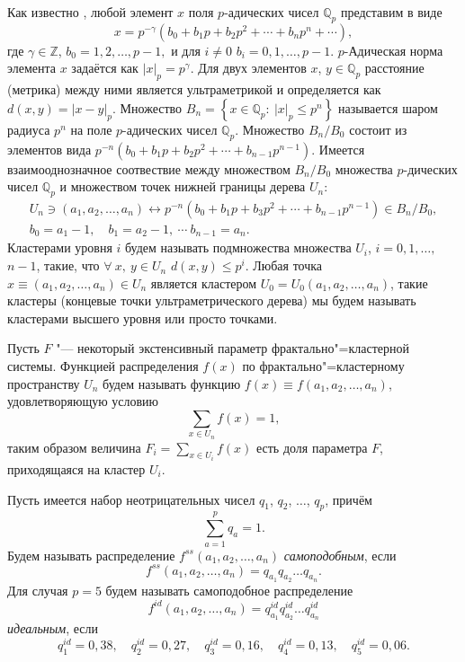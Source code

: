 Как известно \cite{zubarev_volov:bib:S,zubarev_volov:bib:VVZ}, любой элемент $x$ поля $p$-адических чисел $\mathbb Q_p$ представим в виде
$$x=p^{-\gamma}\left(b_{0}+b_{1}p+b_{2}p^{2}+\cdots+b_{n}p^{n}+\cdots\right),$$
где $\gamma\in\mathbb{Z}$, $b_{0}=1, 2, \ldots,p-1,$ и для $i\neq0$
$b_{i}=0, 1, \ldots,p-1$. $p$-Адическая норма элемента $x$ задаётся
как $|x|_{p}=p^{\gamma}.$ 
Для двух элементов $x$, $y\in \mathbb Q_{p}$
расстояние (метрика) между ними является ультраметрикой и
определяется как $d(x,y)=|x-y|_{p}.$ Множество $B_{n}=\left\{
x\in\mathit{\mathbb Q_{p}}:\:|x|_{p}\leq p^{n}\right\} $ называется шаром
радиуса $p^{n}$ на поле $p$-адических чисел
$\mathcal{\mathit{\mathbb Q_{p}}}$. Множество $B_{n}/B_{0}$ состоит из
элементов вида
$p^{-n}\left(b_{0}+b_{1}p+b_{2}p^{2}+\cdots+b_{n-1}p^{n-1}\right)$.
Имеется взаимооднозначное соотвествие между множеством
$B_{n}/B_{0}$ множества $p$-дических чисел $\mathbb Q_{p}$ и множеством
точек нижней границы дерева $U_{n}$:
\begin{gather*}
U_{n}\ni (a_1,a_2,\ldots,a_n) \longleftrightarrow
p^{-n}\left(b_{0}+b_{1}p+b_{3}p^{2}+\cdots+b_{n-1}p^{n-1}\right)\in
B_{n}/B_{0},\\
b_{0}=a_{1}-1, \quad b_{1}=a_{2}-1,\:\cdots\: b_{n-1}=a_{n}.
\end{gather*}
Кластерами уровня $i$ будем называть
подмножества множества $U_i$, $i=0, 1, \ldots,$ $n-1$, такие, что
$\forall\: x,\: y\in U_{n}$ $d(x,y)\leq p^{i}$. Любая точка
$x\equiv\left(a_{1},a_{2},\ldots,a_{n}\right)\in U_{n}$ является
кластером $U_{0}=U_{0}\left(a_{1},a_{2},\ldots,a_{n}\right)$,
такие кластеры (концевые точки ультраметрического дерева) мы будем
называть кластерами высшего уровня или просто точками.

Пусть $F$ "--- некоторый экстенсивный параметр
фрактально"=кластерной системы. Функцией распределения $f(x)$ по
фрактально"=кластерному пространству $U_{n}$ будем называть
функцию $f(x)\equiv f(a_1,a_2,\ldots,a_n)$, удовлетворяющую
условию
\[
\sum_{x\in U_{n}}f(x)=1,
\]
таким образом величина $F_i=\sum_{x\in U_i}f(x)$ есть доля параметра
$F$, приходящаяся на кластер $U_i$.

Пусть имеется набор неотрицательных чисел $q_1$, $q_2$, $\ldots$,
$q_p$, причём
\[
\sum_{a=1}^p q_a=1.
\]
Будем называть распределение $f^{ss}(a_1,a_2,\ldots,a_n)$ {\sl самоподобным}, если
\begin{equation}
f^{ss}(a_1,a_2,\ldots,a_n)=q_{a_1}q_{a_2}\ldots q_{a_n}.
\label{ss}
\end{equation}
Для случая $p=5$ будем называть самоподобное распределение
$$f^{id}(a_1,a_2,\ldots,a_n)=q_{a_1}^{id}q_{a_2}^{id}\ldots
q_{a_n}^{id}$$ {\sl идеальным}, если
\[
q_1^{id}=0,38,\quad  q_2^{id}=0,27,\quad q_3^{id}=0,16,\quad
q_4^{id}=0,13,\quad q_5^{id}=0,06.
\]

